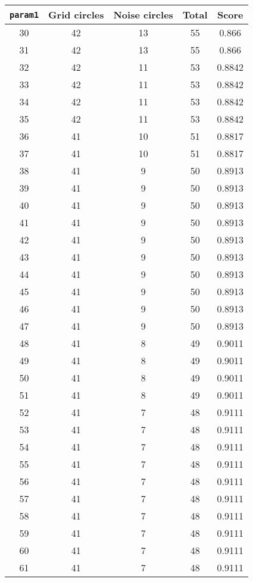 \documentclass[letterpaper, 12pt]{article}
\begin{document}
\begin{longtable}{|c|c|c|c|c|}
\hline
\textbf{\texttt{param1}} & \textbf{Grid circles} & \textbf{Noise circles} & \textbf{Total} & \textbf{Score} \\
\hline
30 & 42 & 13 & 55 & 0.866 \\
\hline
31 & 42 & 13 & 55 & 0.866 \\
\hline
32 & 42 & 11 & 53 & 0.8842 \\
\hline
33 & 42 & 11 & 53 & 0.8842 \\
\hline
34 & 42 & 11 & 53 & 0.8842 \\
\hline
35 & 42 & 11 & 53 & 0.8842 \\
\hline
36 & 41 & 10 & 51 & 0.8817 \\
\hline
37 & 41 & 10 & 51 & 0.8817 \\
\hline
38 & 41 & 9 & 50 & 0.8913 \\
\hline
39 & 41 & 9 & 50 & 0.8913 \\
\hline
40 & 41 & 9 & 50 & 0.8913 \\
\hline
41 & 41 & 9 & 50 & 0.8913 \\
\hline
42 & 41 & 9 & 50 & 0.8913 \\
\hline
43 & 41 & 9 & 50 & 0.8913 \\
\hline
44 & 41 & 9 & 50 & 0.8913 \\
\hline
45 & 41 & 9 & 50 & 0.8913 \\
\hline
46 & 41 & 9 & 50 & 0.8913 \\
\hline
47 & 41 & 9 & 50 & 0.8913 \\
\hline
48 & 41 & 8 & 49 & 0.9011 \\
\hline
49 & 41 & 8 & 49 & 0.9011 \\
\hline
50 & 41 & 8 & 49 & 0.9011 \\
\hline
51 & 41 & 8 & 49 & 0.9011 \\
\hline
52 & 41 & 7 & 48 & 0.9111 \\
\hline
53 & 41 & 7 & 48 & 0.9111 \\
\hline
54 & 41 & 7 & 48 & 0.9111 \\
\hline
55 & 41 & 7 & 48 & 0.9111 \\
\hline
56 & 41 & 7 & 48 & 0.9111 \\
\hline
57 & 41 & 7 & 48 & 0.9111 \\
\hline
58 & 41 & 7 & 48 & 0.9111 \\
\hline
59 & 41 & 7 & 48 & 0.9111 \\
\hline
60 & 41 & 7 & 48 & 0.9111 \\
\hline
61 & 41 & 7 & 48 & 0.9111 \\

\end{longtable}
\end{document}

